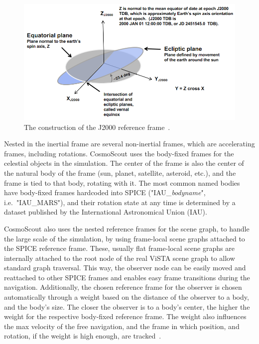 \begin{figure}[h]
    \centering
    \includegraphics[width=\textwidth]{content/3_current_state/img/J2000[NAIFoverview]}
    \caption{The construction of the J2000 reference frame~\cite{NAIFoverview}.}
    \label{fig:J2000}
\end{figure}

Nested in the inertial frame are several non-inertial frames, which are accelerating frames, including rotations.
CosmoScout uses the body-fixed frames for the celestial objects in the simulation.
The center of the frame is also the center of the natural body of the frame (sun, planet, satellite, asteroid, etc.),
and the frame is tied to that body, rotating with it.
The most common named bodies have body-fixed frames hardcoded into SPICE ("IAU\_\textit{bodyname}", i.e.\ "IAU\_MARS"),
and their rotation state at any time is determined by a dataset published by the International Astronomical Union (IAU).

CosmoScout also uses the nested reference frames for the scene graph, to handle the large scale of the simulation, by
using frame-local scene graphs attached to the SPICE reference frame.
These, usually flat frame-local scene graphs are internally attached to the root node of the real ViSTA scene graph to
allow standard graph traversal.
This way, the observer node can be easily moved and reattached to other SPICE frames and enables easy frame
transitions during the navigation.
Additionally, the chosen reference frame for the observer is chosen automatically through a weight based on the
distance of the observer to a body, and the body's size.
The closer the observer is to a body's center, the higher the weight for the respective body-fixed reference frame.
The weight also influences the max velocity of the free navigation, and the frame in which position, and rotation, if
the weight is high enough, are tracked~\cite{SimonPaper}.

